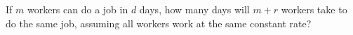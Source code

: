 If $m$ workers can do a job in $d$ days, how many days will $m+r$ workers take to do the same job, assuming all workers work at the same constant rate?
